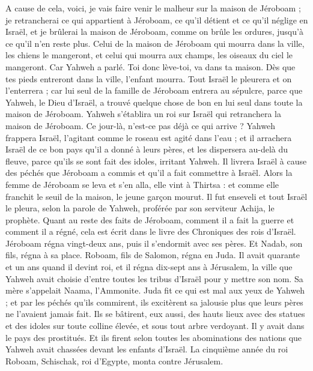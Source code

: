 \begin{multicols}{2}
A cause de cela, voici, je vais faire venir le malheur sur la maison de Jéroboam ; je retrancherai ce qui appartient à Jéroboam, ce qu’il détient et ce qu’il néglige en Israël, et je brûlerai la maison de Jéroboam, comme on brûle les ordures, jusqu'à ce qu'il n'en reste plus.
Celui de la maison de Jéroboam qui mourra dans la ville, les chiens le mangeront, et celui qui mourra aux champs, les oiseaux du ciel le mangeront. Car Yahweh a parlé.
Toi donc lève-toi, va dans ta maison. Dès que tes pieds entreront dans la ville, l'enfant mourra.
Tout Israël le pleurera et on l’enterrera ; car lui seul de la famille de Jéroboam entrera au sépulcre, parce que Yahweh, le Dieu d'Israël, a trouvé quelque chose de bon en lui seul dans toute la maison de Jéroboam.
Yahweh s'établira un roi sur Israël qui retranchera la maison de Jéroboam. Ce jour-là, n’est-ce pas déjà ce qui arrive ?
Yahweh frappera Israël, l'agitant comme le roseau est agité dans l'eau ; et il arrachera Israël de ce bon pays qu'il a donné à leurs pères, et les dispersera au-delà du fleuve, parce qu'ils se sont fait des idoles, irritant Yahweh.
Il livrera Israël à cause des péchés que Jéroboam a commis et qu’il a fait commettre à Israël.
Alors la femme de Jéroboam se leva et s'en alla, elle vint à Thirtsa : et comme elle franchit le seuil de la maison, le jeune garçon mourut.
Il fut enseveli et tout Israël le pleura, selon la parole de Yahweh, proférée par son serviteur Achija, le prophète.
Quant au reste des faits de Jéroboam, comment il a fait la guerre et comment il a régné, cela est écrit dans le livre des Chroniques des rois d'Israël.
Jéroboam régna vingt-deux ans, puis il s'endormit avec ses pères. Et Nadab, son fils, régna à sa place.
Roboam, fils de Salomon, régna en Juda. Il avait quarante et un ans quand il devint roi, et il régna dix-sept ans à Jérusalem, la ville que Yahweh avait choisie d'entre toutes les tribus d'Israël pour y mettre son nom. Sa mère s’appelait Naama, l’Ammonite.
Juda fit ce qui est mal aux yeux de Yahweh ; et par les péchés qu'ils commirent, ils excitèrent sa jalousie plus que leurs pères ne l'avaient jamais fait.
Ils se bâtirent, eux aussi, des hauts lieux avec des statues et des idoles sur toute colline élevée, et sous tout arbre verdoyant.
Il y avait dans le pays des prostitués. Et ils firent selon toutes les abominations des nations que Yahweh avait chassées devant les enfants d'Israël.
La cinquième année du roi Roboam, Schischak, roi d'Egypte, monta contre Jérusalem.

\end{multicols}
